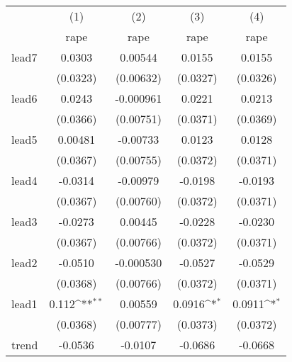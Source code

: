 {
\def\sym#1{\ifmmode^{#1}\else\(^{#1}\)\fi}
\begin{tabular}{l*{4}{c}}
\hline\hline
            &\multicolumn{1}{c}{(1)}&\multicolumn{1}{c}{(2)}&\multicolumn{1}{c}{(3)}&\multicolumn{1}{c}{(4)}\\
            &\multicolumn{1}{c}{rape}&\multicolumn{1}{c}{rape}&\multicolumn{1}{c}{rape}&\multicolumn{1}{c}{rape}\\
\hline
lead7       &      0.0303         &     0.00544         &      0.0155         &      0.0155         \\
            &    (0.0323)         &   (0.00632)         &    (0.0327)         &    (0.0326)         \\
[1em]
lead6       &      0.0243         &   -0.000961         &      0.0221         &      0.0213         \\
            &    (0.0366)         &   (0.00751)         &    (0.0371)         &    (0.0369)         \\
[1em]
lead5       &     0.00481         &    -0.00733         &      0.0123         &      0.0128         \\
            &    (0.0367)         &   (0.00755)         &    (0.0372)         &    (0.0371)         \\
[1em]
lead4       &     -0.0314         &    -0.00979         &     -0.0198         &     -0.0193         \\
            &    (0.0367)         &   (0.00760)         &    (0.0372)         &    (0.0371)         \\
[1em]
lead3       &     -0.0273         &     0.00445         &     -0.0228         &     -0.0230         \\
            &    (0.0367)         &   (0.00766)         &    (0.0372)         &    (0.0371)         \\
[1em]
lead2       &     -0.0510         &   -0.000530         &     -0.0527         &     -0.0529         \\
            &    (0.0368)         &   (0.00766)         &    (0.0372)         &    (0.0371)         \\
[1em]
lead1       &       0.112\sym{**} &     0.00559         &      0.0916\sym{*}  &      0.0911\sym{*}  \\
            &    (0.0368)         &   (0.00777)         &    (0.0373)         &    (0.0372)         \\
[1em]
trend       &     -0.0536         &     -0.0107         &     -0.0686         &     -0.0668         \\

\end{tabular}}
